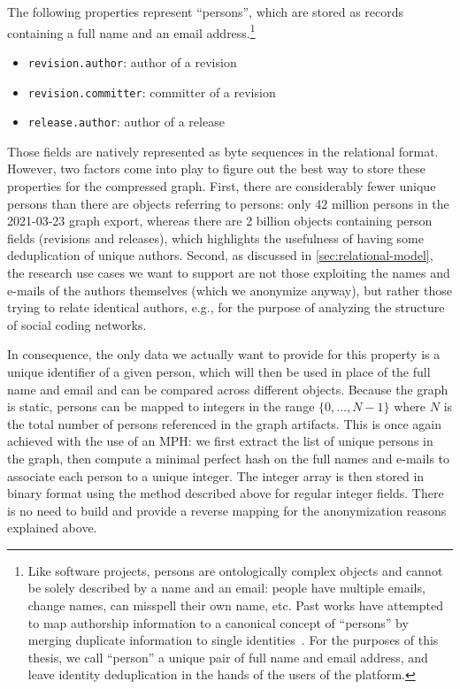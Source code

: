 The following properties represent ``persons'', which are stored as records
containing a full name and an email address.\footnote{Like software projects,
persons are ontologically complex objects and cannot be solely described by a
name and an email: people have multiple emails, change names, can misspell
their own name, etc. Past works have attempted to map authorship information to
a canonical concept of ``persons'' by merging duplicate information to single
identities~\cite{wiese2016mailing, zhu2019empirical}. For the purposes of this
thesis, we call ``person'' a unique pair of full name and email address, and
leave identity deduplication in the hands of the users of the platform.}

\begin{itemize}
    \setlength\itemsep{0em}
    \item \texttt{revision.author}: author of a revision
    \item \texttt{revision.committer}: committer of a revision
    \item \texttt{release.author}: author of a release
\end{itemize}

Those fields are natively represented as byte sequences in the relational
format.  However, two factors come into play to figure out the best way to
store these properties for the compressed graph. First, there are considerably
fewer unique persons than there are objects referring to persons: only 42
million persons in the 2021-03-23 graph export, whereas there are 2 billion
objects containing person fields (revisions and releases), which highlights the
usefulness of having some deduplication of unique authors. Second, as discussed
in \cref{sec:relational-model}, the research use cases we want to support are
not those exploiting the names and e-mails of the authors themselves (which we
anonymize anyway), but rather those trying to relate identical authors, e.g.,
for the purpose of analyzing the structure of social coding networks.

In consequence, the only data we actually want to provide for this property is
a unique identifier of a given person, which will then be used in place of the
full name and email and can be compared across different objects.
Because the graph is static, persons can be mapped to integers in the range
$\{0,\ldots,N-1\}$ where $N$ is the total number of persons referenced in the
graph artifacts. This is once again achieved with the use of an \gls{MPH}: we
first extract the list of unique persons in the graph, then compute a minimal
perfect hash on the full names and e-mails to associate each person to a unique
integer. The integer array is then stored in binary format using the method
described above for regular integer fields. There is no need to build and
provide a reverse mapping for the anonymization reasons explained above.

